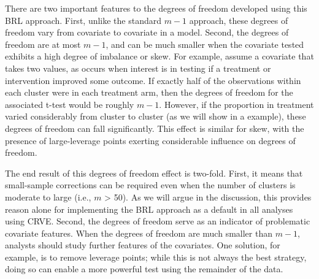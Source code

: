 \documentclass[12pt]{article}
\newcommand{\bm}{\mathbf}
\newcommand{\bs}{\boldsymbol}
\begin{document}
There are two important features to the degrees of freedom developed using this BRL approach. First, unlike the standard $m - 1$ approach, these degrees of freedom vary from covariate to covariate in a model. Second, the degrees of freedom are at most $m - 1$, and can be much smaller when the covariate tested exhibits a high degree of imbalance or skew. For example, assume a covariate that takes two values, as occurs when interest is in testing if a treatment or intervention improved some outcome. If exactly half of the observations within each cluster were in each treatment arm, then the degrees of freedom for the associated t-test would be roughly $m - 1$. However, if the proportion in treatment varied considerably from cluster to cluster (as we will show in a example), these degrees of freedom can fall significantly. This effect is similar for skew, with the presence of large-leverage points exerting considerable influence on degrees of freedom. 

The end result of this degrees of freedom effect is two-fold. First, it means that small-sample corrections can be required even when the number of clusters is moderate to large (i.e., $m$ > 50). As we will argue in the discussion, this provides reason alone for implementing the BRL approach as a default in all analyses using CRVE. Second, the degrees of freedom serve as an indicator of problematic covariate features. When the degrees of freedom are much smaller than $m - 1$, analysts should study further features of the covariates. One solution, for example, is to remove leverage points; while this is not always the best strategy, doing so can enable a more powerful test using the remainder of the data. 

% 
\end{document}
